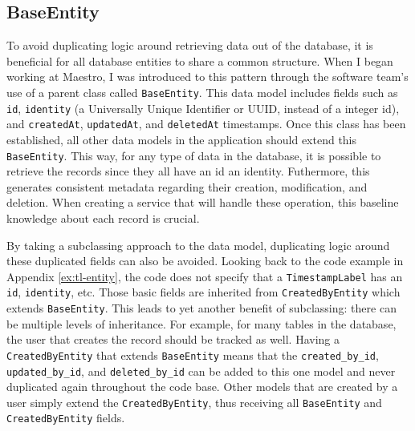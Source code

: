 \subsection{BaseEntity}

To avoid duplicating logic around retrieving data out of the database, it is beneficial for all database entities to share a common structure.  When I began working at Maestro, I was introduced to this pattern through the software team's use of a parent class called \verb!BaseEntity!.  This data model includes fields such as \verb!id!, \verb!identity! (a Universally Unique Identifier or UUID, instead of a integer id), and \verb!createdAt!, \verb!updatedAt!, and \verb!deletedAt! timestamps.  Once this class has been established, all other data models in the application should extend this \verb!BaseEntity!.  This way, for any type of data in the database, it is possible to retrieve the records since they all have an id an identity. Futhermore, this generates consistent metadata regarding their creation, modification, and deletion. When creating a service that will handle these operation, this baseline knowledge about each record is crucial.

By taking a subclassing approach to the data model, duplicating logic around these duplicated fields can also be avoided.  Looking back to the code example in Appendix \ref{ex:tl-entity}, the code does not specify that a \verb!TimestampLabel! has an \verb!id!, \verb!identity!, etc. Those basic fields are inherited from \verb!CreatedByEntity! which extends \verb!BaseEntity!.  This leads to yet another benefit of subclassing: there can be multiple levels of inheritance. For example, for many tables in the database, the user that creates the record should be tracked as well.  Having a \verb!CreatedByEntity! that extends \verb!BaseEntity! means that the \verb!created_by_id!, \verb!updated_by_id!, and \verb!deleted_by_id! can be added to this one model and never duplicated again throughout the code base.  Other models that are created by a user simply extend the \verb!CreatedByEntity!, thus receiving all \verb!BaseEntity! and \verb!CreatedByEntity! fields.